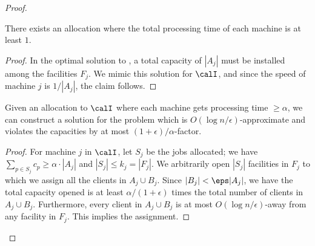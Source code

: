 \begin{proof}
\begin{claim}
There exists an allocation where the total processing time of each machine is at least $1$.
\end{claim}
\begin{proof}
	In the optimal solution to \mckc, a total capacity of $|A_j|$ must be installed among the facilities $F_j$. 
	We mimic this solution for $\calI$, and since the speed of machine $j$ is $1/|A_j|$, the claim follows.
\end{proof}
\begin{claim}
	Given an allocation to $\calI$ where each machine gets processing time $\geq \alpha$, we can construct a solution for the \mckc problem
	which is $O(\log n/\epsilon)$-approximate and violates the capacities by at most $(1+\epsilon)/\alpha$-factor.
\end{claim}
\begin{proof}
For machine $j$ in $\calI$, let $S_j$ be the jobs allocated; we have $\sum_{p\in S_j} c_p \ge \alpha\cdot |A_j|$ and $|S_j| \leq k_j = |F_j|$.
We arbitrarily open $|S_j|$ facilities in $F_j$ to which we assign all the clients in $A_j \cup B_j$. Since $|B_j|<\eps |A_j|$, we have the total capacity opened is at least $\alpha/(1+\epsilon)$ times 
the total number of clients in $A_j\cup B_j$. Furthermore, every client in $A_j\cup B_j$ is at most $O(\log n/\epsilon)$-away from any facility in $F_j$. This implies the assignment.
\end{proof}	
\end{proof}

